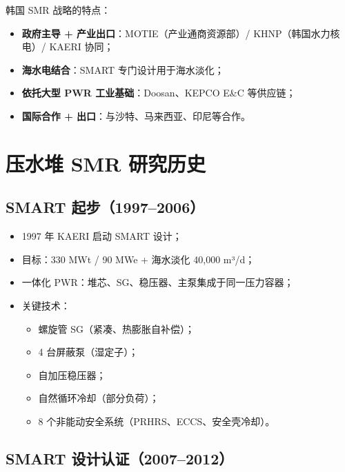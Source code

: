 \documentclass[
  UTF8,
  scheme=plain,
  fontsize=10pt,
  openany
]{ctexbook}
\begin{document}
韩国 SMR 战略的特点：

\begin{itemize}
\tightlist
\item
  \textbf{政府主导 + 产业出口}：MOTIE（产业通商资源部）/
  KHNP（韩国水力核电）/ KAERI 协同；
\item
  \textbf{海水电结合}：SMART 专门设计用于海水淡化；
\item
  \textbf{依托大型 PWR 工业基础}：Doosan、KEPCO E\&C 等供应链；
\item
  \textbf{国际合作 + 出口}：与沙特、马来西亚、印尼等合作。
\end{itemize}

\section{压水堆 SMR
研究历史}\label{ux538bux6c34ux5806-smr-ux7814ux7a76ux5386ux53f2}

\subsection{SMART 起步（1997--2006）}\label{smart-ux8d77ux6b6519972006}

\begin{itemize}
\tightlist
\item
  1997 年 KAERI 启动 SMART 设计；
\item
  目标：330 MWt / 90 MWe + 海水淡化 40,000 m³/d；
\item
  一体化 PWR：堆芯、SG、稳压器、主泵集成于同一压力容器；
\item
  关键技术：

  \begin{itemize}
  \tightlist
  \item
    螺旋管 SG（紧凑、热膨胀自补偿）；
  \item
    4 台屏蔽泵（湿定子）；
  \item
    自加压稳压器；
  \item
    自然循环冷却（部分负荷）；
  \item
    8 个非能动安全系统（PRHRS、ECCS、安全壳冷却）。
  \end{itemize}
\end{itemize}

\subsection{SMART
设计认证（2007--2012）}\label{smart-ux8bbeux8ba1ux8ba4ux8bc120072012}
\end{document}
